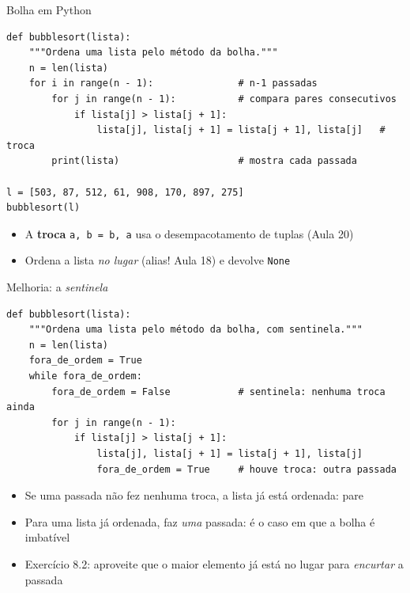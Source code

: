 \documentclass[aspectratio=169,10pt,t]{beamer}
\begin{document}
\begin{frame}[fragile]{Bolha em Python}
\begin{lstlisting}
def bubblesort(lista):
    """Ordena uma lista pelo método da bolha."""
    n = len(lista)
    for i in range(n - 1):               # n-1 passadas
        for j in range(n - 1):           # compara pares consecutivos
            if lista[j] > lista[j + 1]:
                lista[j], lista[j + 1] = lista[j + 1], lista[j]   # troca
        print(lista)                     # mostra cada passada

l = [503, 87, 512, 61, 908, 170, 897, 275]
bubblesort(l)
\end{lstlisting}
  \begin{itemize}
    \item A \textbf{troca} \texttt{a, b = b, a} usa o desempacotamento de tuplas (Aula 20)
    \item Ordena a lista \emph{no lugar} (alias! Aula 18) e devolve \texttt{None}
  \end{itemize}
\end{frame}

\begin{frame}[fragile]{Melhoria: a \emph{sentinela}}
\begin{lstlisting}[basicstyle=\ttfamily\scriptsize]
def bubblesort(lista):
    """Ordena uma lista pelo método da bolha, com sentinela."""
    n = len(lista)
    fora_de_ordem = True
    while fora_de_ordem:
        fora_de_ordem = False            # sentinela: nenhuma troca ainda
        for j in range(n - 1):
            if lista[j] > lista[j + 1]:
                lista[j], lista[j + 1] = lista[j + 1], lista[j]
                fora_de_ordem = True     # houve troca: outra passada
\end{lstlisting}
  \begin{itemize}
    \item Se uma passada \alert{não fez nenhuma troca}, a lista já está ordenada: pare
    \item Para uma lista já ordenada, faz \emph{uma} passada: é o caso em que a bolha é imbatível
    \item Exercício 8.2: aproveite que o maior elemento já está no lugar para \emph{encurtar} a passada
  \end{itemize}
\end{frame}
\end{document}
